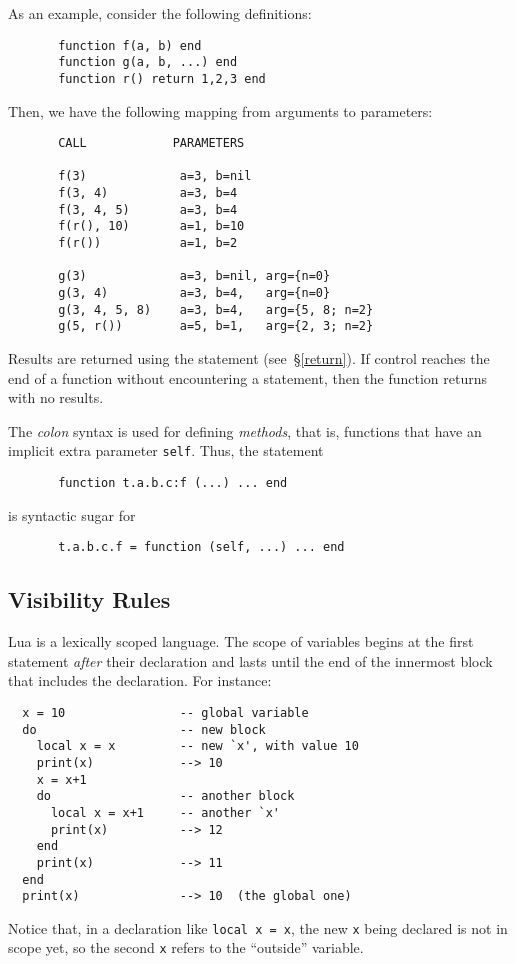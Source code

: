 \documentclass[11pt,twoside]{article}
\makeatletter
\newcommand{\See}[1]{\S\ref{#1}}
\newcommand{\see}[1]{(see~\See{#1})}
\newcommand{\T}[1]{{\tt #1}}
\newcommand{\IndexVerb}[1]{\T{#1}\index{#1@{\tt #1}}}
\newcommand{\IndexEmph}[1]{\emph{#1}\index{#1@{\lowercase{#1}}}}
\newcommand{\Q}[1]{``#1''}
\makeatother
\begin{document}
As an example, consider the following definitions:
\begin{verbatim}
       function f(a, b) end
       function g(a, b, ...) end
       function r() return 1,2,3 end
\end{verbatim}
Then, we have the following mapping from arguments to parameters:
\begin{verbatim}
       CALL            PARAMETERS

       f(3)             a=3, b=nil
       f(3, 4)          a=3, b=4
       f(3, 4, 5)       a=3, b=4
       f(r(), 10)       a=1, b=10
       f(r())           a=1, b=2

       g(3)             a=3, b=nil, arg={n=0}
       g(3, 4)          a=3, b=4,   arg={n=0}
       g(3, 4, 5, 8)    a=3, b=4,   arg={5, 8; n=2}
       g(5, r())        a=5, b=1,   arg={2, 3; n=2}
\end{verbatim}

Results are returned using the  statement \see{return}.
If control reaches the end of a function
without encountering a  statement,
then the function returns with no results.

The \emph{colon} syntax
is used for defining \IndexEmph{methods},
that is, functions that have an implicit extra parameter \IndexVerb{self}.
Thus, the statement
\begin{verbatim}
       function t.a.b.c:f (...) ... end
\end{verbatim}
is syntactic sugar for
\begin{verbatim}
       t.a.b.c.f = function (self, ...) ... end
\end{verbatim}


\subsection{Visibility Rules} \label{visibility}

Lua is a lexically scoped language.
The scope of variables begins at the first statement \emph{after}
their declaration and lasts until the end of the innermost block that
includes the declaration.
For instance:
\begin{verbatim}
  x = 10                -- global variable
  do                    -- new block
    local x = x         -- new `x', with value 10
    print(x)            --> 10
    x = x+1
    do                  -- another block
      local x = x+1     -- another `x'
      print(x)          --> 12
    end
    print(x)            --> 11
  end
  print(x)              --> 10  (the global one)
\end{verbatim}
Notice that, in a declaration like \verb|local x = x|,
the new \verb|x| being declared is not in scope yet,
so the second \verb|x| refers to the \Q{outside} variable.
\end{document}
